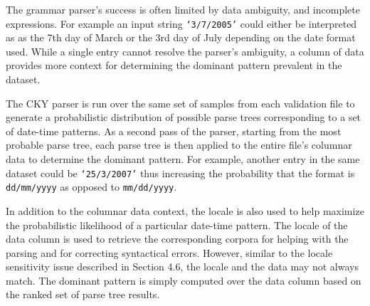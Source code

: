 The grammar parser's success is often limited by data ambiguity, and incomplete expressions. For example an input string \texttt{`3/7/2005'} could either be interpreted as as the 7th day of March or the 3rd day of July depending on the date format used. While a single entry cannot resolve the parser's ambiguity, a column of data provides more context for determining the dominant pattern prevalent in the dataset. 

The CKY parser is run over the same set of samples from each validation file to generate a probabilistic distribution of possible parse trees corresponding to a set of date-time patterns. As a second pass of the parser, starting from the most probable parse tree, each parse tree is then applied to the entire file's columnar data to determine the dominant pattern. For example, another entry in the same dataset could be \texttt{`25/3/2007'} thus increasing the probability that the format is \texttt{dd/mm/yyyy} as opposed to \texttt{mm/dd/yyyy}.

In addition to the columnar data context, the locale is also used to help maximize the probabilistic likelihood of a particular date-time pattern. The locale of the data column is used to retrieve the corresponding corpora for helping with the parsing and for correcting syntactical errors. However, similar to the locale sensitivity issue described in Section 4.6, the locale and the data may not always match. The dominant pattern is simply computed over the data column based on the ranked set of parse tree results.
